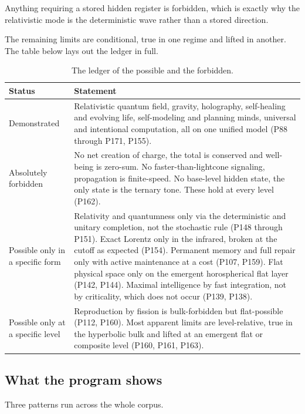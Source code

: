Anything requiring a
stored hidden register is forbidden, which is exactly why the relativistic mode is the deterministic wave
rather than a stored direction.

The remaining limits are conditional, true in one regime and lifted in another. The table below lays out the
ledger in full.

\begin{table}[ht]
\centering
\caption{The ledger of the possible and the forbidden.}
\begin{tabular}{p{}p{}}
\toprule
Status & Statement \\
\midrule
Demonstrated & Relativistic quantum field, gravity, holography, self-healing and evolving life, self-modeling and planning minds, universal and intentional computation, all on one unified model (P88 through P171, P155). \\
\addlinespace
Absolutely forbidden & No net creation of charge, the total is conserved and well-being is zero-sum. No faster-than-lightcone signaling, propagation is finite-speed. No base-level hidden state, the only state is the ternary tone. These hold at every level (P162). \\
\addlinespace
Possible only in a specific form & Relativity and quantumness only via the deterministic and unitary completion, not the stochastic rule (P148 through P151). Exact Lorentz only in the infrared, broken at the cutoff as expected (P154). Permanent memory and full repair only with active maintenance at a cost (P107, P159). Flat physical space only on the emergent horospherical flat layer (P142, P144). Maximal intelligence by fast integration, not by criticality, which does not occur (P139, P138). \\
\addlinespace
Possible only at a specific level & Reproduction by fission is bulk-forbidden but flat-possible (P112, P160). Most apparent limits are level-relative, true in the hyperbolic bulk and lifted at an emergent flat or composite level (P160, P161, P163). \\
\bottomrule
\end{tabular}
\end{table}

\subsection{What the program shows}

Three patterns run across the whole corpus.

